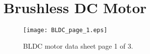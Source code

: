 
\chapter{Brushless DC Motor} 
\label{appendA}

\ifpdf
    \graphicspath{{8_Appendices/figures/PNG/}{8_Appendices/figures/PDF/}{8_Appendices/figures/}}
\else
    \graphicspath{{8_Appendices/figures/EPS/}{8_Appendices/figures/}}
\fi


\begin{figure}
	\begin{center}
		\texttt{[image: BLDC\_page\_1.eps]}
		\caption{BLDC motor data sheet page 1 of 3.}
		\label{fig:BLDC1}
	\end{center}
\end{figure}

